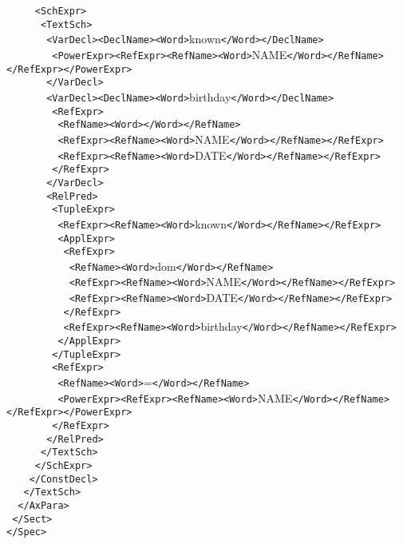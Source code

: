 \documentclass[a4paper,10pt]{article}
\begin{document}
\begin{zed}
\verb&     <SchExpr>&\\
\verb&      <TextSch>&\\
\verb&       <VarDecl><DeclName><Word>&known\verb&</Word></DeclName>&\\
\verb&        <PowerExpr><RefExpr><RefName><Word>&NAME\verb&</Word></RefName></RefExpr></PowerExpr>&\\
\verb&       </VarDecl>&\\
\verb&       <VarDecl><DeclName><Word>&birthday\verb&</Word></DeclName>&\\
\verb&        <RefExpr>&\\
\verb&         <RefName><Word>&\Join\pfun\Join\verb&</Word></RefName>&\\
\verb&         <RefExpr><RefName><Word>&NAME\verb&</Word></RefName></RefExpr>&\\
\verb&         <RefExpr><RefName><Word>&DATE\verb&</Word></RefName></RefExpr>&\\
\verb&        </RefExpr>&\\
\verb&       </VarDecl>&\\
\verb&       <RelPred>&\\
\verb&        <TupleExpr>&\\
\verb&         <RefExpr><RefName><Word>&known\verb&</Word></RefName></RefExpr>&\\
\verb&         <ApplExpr>&\\
\verb&          <RefExpr>&\\
\verb&           <RefName><Word>&dom\verb&</Word></RefName>&\\
\verb&           <RefExpr><RefName><Word>&NAME\verb&</Word></RefName></RefExpr>&\\
\verb&           <RefExpr><RefName><Word>&DATE\verb&</Word></RefName></RefExpr>&\\
\verb&          </RefExpr>&\\
\verb&          <RefExpr><RefName><Word>&birthday\verb&</Word></RefName></RefExpr>&\\
\verb&         </ApplExpr>&\\
\verb&        </TupleExpr>&\\
\verb&        <RefExpr>&\\
\verb&         <RefName><Word>&\Join=\Join\verb&</Word></RefName>&\\
\verb&         <PowerExpr><RefExpr><RefName><Word>&NAME\verb&</Word></RefName></RefExpr></PowerExpr>&\\
\verb&        </RefExpr>&\\
\verb&       </RelPred>&\\
\verb&      </TextSch>&\\
\verb&     </SchExpr>&\\
\verb&    </ConstDecl>&\\
\verb&   </TextSch>&\\
\verb&  </AxPara>&\\
\verb& </Sect>&\\
\verb&</Spec>&\\
\end{zed}
\end{document}
